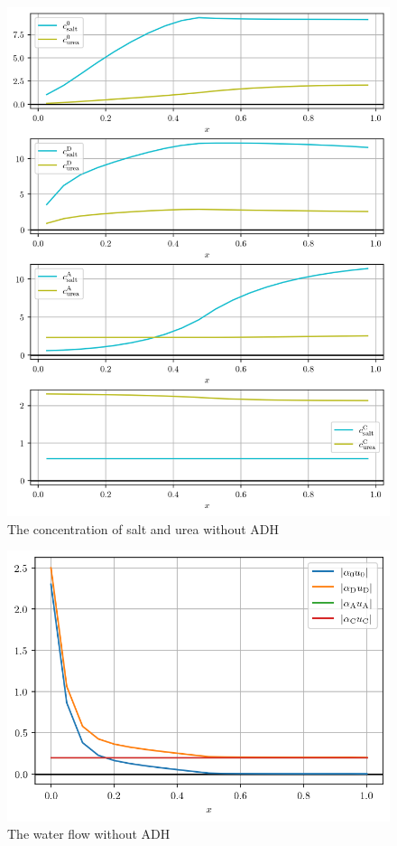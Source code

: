 \documentclass{article}
\begin{document}
\begin{figure}
    \centering
    \includegraphics[width=.9\textwidth]{../results/4-7-2023/noADH_c.png}
    \caption{The concentration of salt and urea without ADH}
\end{figure}

\begin{figure}
    \centering
    \includegraphics[width=.9\textwidth]{../results/4-7-2023/noADH_flows.png}
    \caption{The water flow without ADH}
\end{figure}
\end{document}
